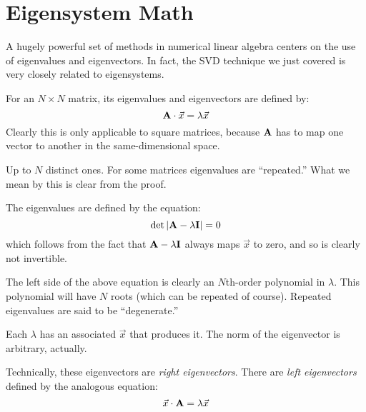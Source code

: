 \section{Eigensystem Math}

A hugely powerful set of methods in numerical linear algebra centers
on the use of eigenvalues and eigenvectors. In fact, the SVD technique
we just covered is very closely related to eigensystems.


\begin{answer}
For an $N\times N$ matrix, its eigenvalues and eigenvectors are
defined by:
\begin{equation}
{\bf A}\cdot\vec{x} = \lambda \vec{x}
\end{equation}
Clearly this is only applicable to square matrices, because ${\bf A}$
has to map one vector to another in the same-dimensional space.
\end{answer}


\begin{answer}
Up to $N$ distinct ones. For some matrices eigenvalues are
``repeated.'' What we mean by this is clear from the proof.

The eigenvalues are defined by the equation:
\begin{equation}
\det\left|{\bf A} - \lambda {\bf I}\right| = 0
\end{equation}
which follows from the fact that ${\bf A} - \lambda {\bf I}$ always
maps $\vec{x}$ to zero, and so is clearly not invertible.

The left side of the above equation is clearly an $N$th-order
polynomial in $\lambda$. This polynomial will have $N$ roots (which
can be repeated of course). Repeated eigenvalues are said to be
``degenerate.'' 

Each $\lambda$ has an associated $\vec{x}$ that produces it. The norm
of the eigenvector is arbitrary, actually.
\end{answer}

Technically, these eigenvectors are {\it right eigenvectors}. There
are {\it left eigenvectors} defined by the analogous equation:
\begin{equation}
\vec{x}\cdot{\bf A} = \lambda \vec{x}
\end{equation}


